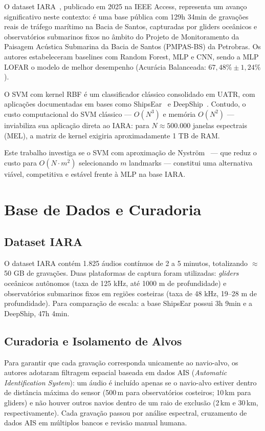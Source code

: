 \documentclass[a4paper,12pt]{article}
\begin{document}
O dataset IARA~\cite{silva2025}, publicado em 2025 na IEEE Access, representa um avanço significativo neste contexto: é uma base pública com 129h 34min de gravações reais de tráfego marítimo na Bacia de Santos, capturadas por gliders oceânicos e observatórios submarinos fixos no âmbito do Projeto de Monitoramento da Paisagem Acústica Submarina da Bacia de Santos (PMPAS-BS) da Petrobras. Os autores estabeleceram baselines com Random Forest, MLP e CNN, sendo a MLP LOFAR o modelo de melhor desempenho (Acurácia Balanceada: $67{,}48\% \pm 1{,}24\%$).

O SVM com kernel RBF é um classificador clássico consolidado em UATR, com aplicações documentadas em bases como ShipsEar~\cite{shipsear} e DeepShip~\cite{deepship}. Contudo, o custo computacional do SVM clássico — $O(N^3)$ e memória $O(N^2)$ — inviabiliza sua aplicação direta ao IARA: para $N \approx 500.000$ janelas espectrais (MEL), a matriz de kernel exigiria aproximadamente 1 TB de RAM.

Este trabalho investiga se o SVM com aproximação de Nyström~\cite{nystrom} — que reduz o custo para $O(N \cdot m^2)$ selecionando $m$ landmarks — constitui uma alternativa viável, competitiva e estável frente à MLP na base IARA.

\section{Base de Dados e Curadoria}

\subsection{Dataset IARA}

O dataset IARA contém 1.825 áudios contínuos de 2 a 5 minutos, totalizando $\approx$50 GB de gravações. Duas plataformas de captura foram utilizadas: \textit{gliders} oceânicos autônomos (taxa de 125 kHz, até 1000 m de profundidade) e observatórios submarinos fixos em regiões costeiras (taxa de 48 kHz, 19–28 m de profundidade). Para comparação de escala: a base ShipsEar possui 3h 9min e a DeepShip, 47h 4min.

\subsection{Curadoria e Isolamento de Alvos}

Para garantir que cada gravação corresponda unicamente ao navio-alvo, os autores adotaram filtragem espacial baseada em dados AIS (\textit{Automatic Identification System}): um áudio é incluído apenas se o navio-alvo estiver dentro de distância máxima do sensor (500\,m para observatórios costeiros; 10\,km para gliders) e não houver outros navios dentro de um raio de exclusão (2\,km e 30\,km, respectivamente). Cada gravação passou por análise espectral, cruzamento de dados AIS em múltiplos bancos e revisão manual humana.
\end{document}
